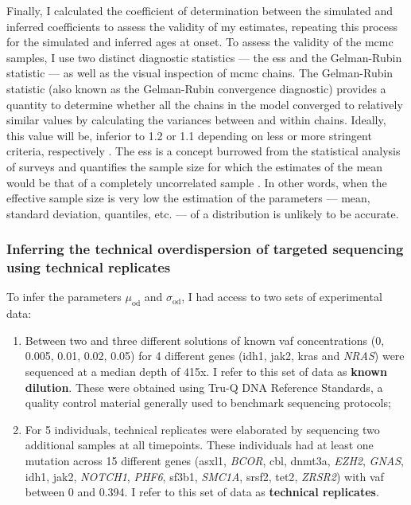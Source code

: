 Finally, I calculated the coefficient of determination between the simulated and inferred coefficients to assess the validity of my estimates, repeating this process for the simulated and inferred ages at onset. To assess the validity of the \ac{mcmc} samples, I use two distinct diagnostic statistics --- the \ac{ess} and the Gelman-Rubin statistic \cite{Gelman1992-zo} --- as well as the visual inspection of \ac{mcmc} chains. The Gelman-Rubin statistic (also known as the Gelman-Rubin convergence diagnostic) provides a quantity to determine whether all the chains in the model converged to relatively similar values by calculating the variances between and within chains. Ideally, this value will be, inferior to 1.2 or 1.1 depending on less or more stringent criteria, respectively \cite{Brooks1998-jx}. The \ac{ess} is a concept burrowed from the statistical analysis of surveys and quantifies the sample size for which the estimates of the mean would be that of a completely uncorrelated sample \cite{Kish1965-ei}. In other words, when the effective sample size is very low the estimation of the parameters --- mean, standard deviation, quantiles, etc. --- of a distribution is unlikely to be accurate.

\subsubsection{Inferring the technical overdispersion of targeted sequencing using technical replicates}

To infer the parameters $\mu_{\mathrm{od}}$ and $\sigma_{\mathrm{od}}$, I had access to two sets of experimental data:

\begin{enumerate}
	\item Between two and three different solutions of known \ac{vaf} concentrations (0, 0.005, 0.01, 0.02, 0.05) for 4 different genes (\ac{idh1}, \ac{jak2}, \ac{kras} and \textit{NRAS}) were sequenced at a median depth of 415x. I refer to this set of data as \textbf{known dilution}. These were obtained using Tru-Q DNA Reference Standards, a quality control material generally used to benchmark sequencing protocols;
	
	\item For 5 individuals, technical replicates were elaborated by sequencing two additional samples at all timepoints. These individuals had at least one mutation across 15 different genes (\ac{asxl1}, \textit{BCOR}, \ac{cbl}, \ac{dnmt3a}, \textit{EZH2}, \textit{GNAS}, \ac{idh1}, \ac{jak2}, \textit{NOTCH1}, \textit{PHF6}, \ac{sf3b1}, \textit{SMC1A}, \ac{srsf2}, \ac{tet2}, \textit{ZRSR2}) with \ac{vaf} between 0 and 0.394. I refer to this set of data as \textbf{technical replicates}.
\end{enumerate}

